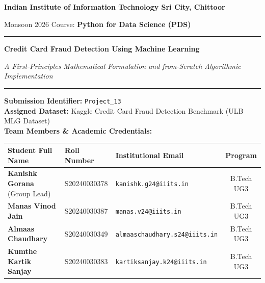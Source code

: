 \documentclass[11pt,a4paper]{article}
\begin{document}
\begin{titlepage}
    \centering
    \vspace*{0.8cm}
    
    {\Large \textbf{Indian Institute of Information Technology Sri City, Chittoor}\par}
    \vspace{0.3cm}
    {\large Monsoon 2026 \textbullet{} Course: \textbf{Python for Data Science (PDS)}\par}
    \vspace{1.0cm}
    
    \rule{\linewidth}{0.6mm}
    \vspace{0.6cm}
    {\Huge \bfseries Credit Card Fraud Detection Using Machine Learning\par}
    \vspace{0.4cm}
    {\Large \itshape A First-Principles Mathematical Formulation and from-Scratch Algorithmic Implementation\par}
    \vspace{0.6cm}
    \rule{\linewidth}{0.6mm}
    
    \vspace{0.8cm}
    {\large \textbf{Submission Identifier:}} \texttt{Project\_13}\\[0.2cm]
    {\normalsize \textbf{Assigned Dataset:} Kaggle Credit Card Fraud Detection Benchmark (ULB MLG Dataset)}\\[0.8cm]
    
    {\large \textbf{Team Members \& Academic Credentials:}}\\[0.3cm]
    \begin{tabular}{lllc}
        \toprule
        \textbf{Student Full Name} & \textbf{Roll Number} & \textbf{Institutional Email} & \textbf{Program} \\
        \midrule
        \textbf{Kanishk Gorana} (Group Lead) & S20240030378 & \texttt{kanishk.g24@iiits.in} & B.Tech UG3 \\
        \textbf{Manas Vinod Jain} & S20240030387 & \texttt{manas.v24@iiits.in} & B.Tech UG3 \\
        \textbf{Almaas Chaudhary} & S20240030349 & \texttt{almaaschaudhary.s24@iiits.in} & B.Tech UG3 \\
        \textbf{Kumthe Kartik Sanjay} & S20240030383 & \texttt{kartiksanjay.k24@iiits.in} & B.Tech UG3 \\
        \bottomrule
    \end{tabular}
    

\end{titlepage}
\end{document}
